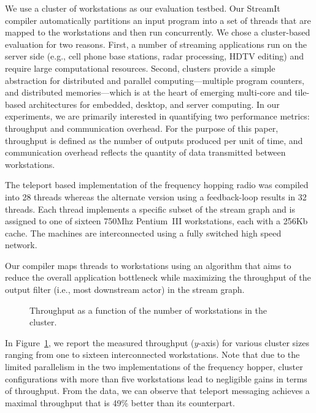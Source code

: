 We use a cluster of workstations as our evaluation testbed. Our
StreamIt compiler automatically partitions an input program into a set
of threads that are mapped to the workstations and then run concurrently.
We chose a cluster-based evaluation for two reasons. 
First, a number of streaming applications run on the server side
(e.g., cell phone base stations, radar processing, HDTV editing) and
require large computational resources. Second, clusters provide a
simple abstraction for distributed and parallel computing---multiple program
counters, and distributed memories---which 
is at the heart of emerging multi-core and tile-based architectures
for embedded, desktop, and server computing.  In our experiments, we are primarily interested in quantifying two
performance metrics: throughput and communication overhead.
For the purpose of this paper, throughput is defined
as the number of outputs produced per unit of time, and communication
overhead reflects the quantity of data transmitted between
workstations.

The teleport based implementation of the frequency hopping
radio was compiled into 28 threads
whereas the alternate version using a feedback-loop results in 
32 threads.  Each thread implements a
specific subset of the stream graph  and is assigned to one of
sixteen 750Mhz Pentium~III workstations, each with a
256Kb cache.  The machines are interconnected using a fully switched
high speed network.

Our compiler maps threads to workstations using an algorithm that aims
to reduce the overall application bottleneck while
maximizing the throughput of the output filter (i.e., most downstream
actor) in the stream graph.

\begin{figure}[t]
\caption{\small Throughput as a function of the number of workstations
in the cluster. 
\protect\label{fig:fhr-throughput}}
\end{figure}

In Figure~\ref{fig:fhr-throughput}, we report the measured throughput
($y$-axis) for various cluster sizes ranging from one to sixteen
interconnected workstations. Note that due to the limited parallelism
in the two implementations of the frequency hopper, cluster
configurations with more than five workstations lead to negligible
gains in terms of throughput. From the data, we can observe that
teleport messaging achieves a maximal throughput that is 49\% better
than its counterpart. %

